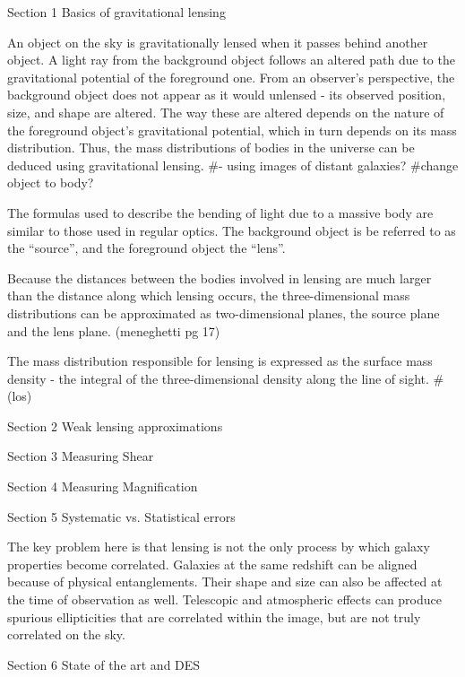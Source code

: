 Section 1
Basics of gravitational lensing

An object on the sky is gravitationally lensed when it passes behind another object.
A light ray from the background object follows an altered path due to the gravitational potential of the foreground one.
From an observer's perspective, the background object does not appear as it would unlensed - its observed position, size, and shape are altered.
The way these are altered depends on the nature of the foreground object's gravitational potential, which in turn depends on its mass distribution.
Thus, the mass distributions of bodies in the universe can be deduced using gravitational lensing. #- using images of distant galaxies?
#change object to body?

The formulas used to describe the bending of light due to a massive body are similar to those used in regular optics.
The background object is be referred to as the ``source'', and the foreground object the ``lens''.

Because the distances between the bodies involved in lensing are much larger than the distance along which lensing occurs, the three-dimensional mass distributions can be approximated as two-dimensional planes, the source plane and the lens plane. (meneghetti pg 17)

The mass distribution responsible for lensing is expressed as the surface mass density - the integral of the three-dimensional density along the line of sight. #(los)






Section 2
Weak lensing approximations


Section 3
Measuring Shear


Section 4
Measuring Magnification


Section 5
Systematic vs. Statistical errors

The key problem here is that lensing is not the only process by which galaxy properties become correlated. Galaxies at the same redshift can be aligned because of physical entanglements. Their shape and size can also be affected at the time of observation as well. Telescopic and atmospheric effects can produce spurious ellipticities that are correlated within the image, but are not truly correlated on the sky. 


Section 6
State of the art and DES
